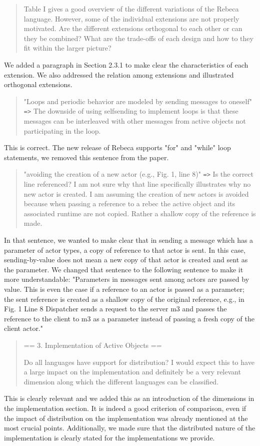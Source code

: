 \documentclass{article}
\begin{document}
\begin{quote}
	Table I gives a good overview of the different variations of the Rebeca language. 
However, some of the individual extensions are not properly motivated. Are the different 
extensions orthogonal to each other or can they be combined? What are the trade-offs of 
each design and how to they fit within the larger picture?
\end{quote}

We added a paragraph in Section 2.3.1 to make clear the characteristics of each 
extension. We also addressed the relation among extensions and illustrated orthogonal 
extensions.


\begin{quote}
"Loops and periodic behavior are modeled by sending messages to oneself" \texttt{=>} The downside 
of using selfsending to implement loops is that these messages can be interleaved with 
other messages from active objects not participating in the loop.
\end{quote}
This is correct.  The new release of Rebeca supports "for" and "while" loop statements, 
we removed this sentence from the paper.


\begin{quote}
	"avoiding the creation of a new actor (e.g., Fig. 1, line 8)" \texttt{=>} Is the correct line 
referenced? I am not sure why that line specifically illustrates why no new actor is 
created. I am assuming the creation of new actors is avoided because when passing a 
reference to a rebec the active object and its associated runtime are not copied. Rather 
a shallow copy of the reference is made.
\end{quote}

In that sentence, we wanted to make clear that in sending a message which has a parameter 
of actor types, a copy of reference to that actor is sent. In this case, sending-by-value 
does not mean a new copy of that actor is created and sent as the parameter.
We changed that sentence to the following sentence to make it more understandable: 
"Parameters in messages sent among actors are passed by value. This is even the case if a 
reference to an actor is passed as a parameter; the sent reference is created as a 
shallow copy of the original reference, e.g., in Fig. 1 Line 8 Dispatcher sends a request 
to the server m3 and passes the reference to the client to m3 as a parameter instead of 
passing a fresh copy of the client actor."


\begin{quote}
	== 3. Implementation of Active Objects ==

Do all languages have support for distribution? I would expect this to have a large 
impact on the implementation and definitely be a very relevant dimension along which the 
different languages can be classified.
\end{quote}
This is clearly relevant and  we added this as an introduction of the dimensions in the 
implementation section. It 
is indeed a good criterion of comparison, even if the impact of 
distribution on the implementation was already 
mentioned at the most crucial points. Additionally, we made sure that the distributed 
nature of the 
implementation is clearly stated for the implementations we provide.
\end{document}

